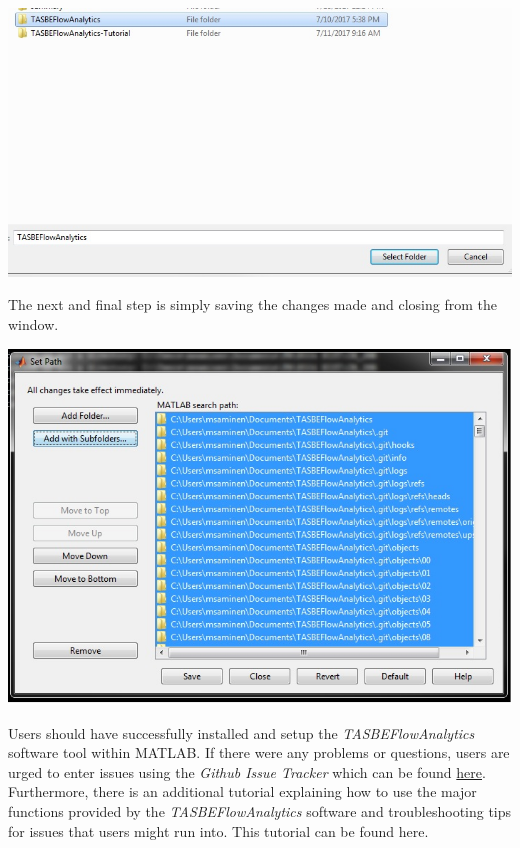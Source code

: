 \begin{center}
  \includegraphics[width=.90\textwidth]{figures/Select_TASBE}
\end{center}

The next and final step is simply saving the changes made and closing from the window. 

\begin{center}
  \includegraphics[width=.90\textwidth]{figures/Save_Close}
\end{center}

Users should have successfully installed and setup the \textit{TASBEFlowAnalytics} software tool within MATLAB. If there were any problems or questions, users are urged to enter issues using the \textit{Github Issue Tracker} which can be found \href{https://github.com/TASBE/TASBEFlowAnalytics/issues}{here}. Furthermore, there is an additional tutorial explaining how to use the major functions provided by the \textit{TASBEFlowAnalytics} software and troubleshooting tips for issues that users might run into. This tutorial can be found here. 
























